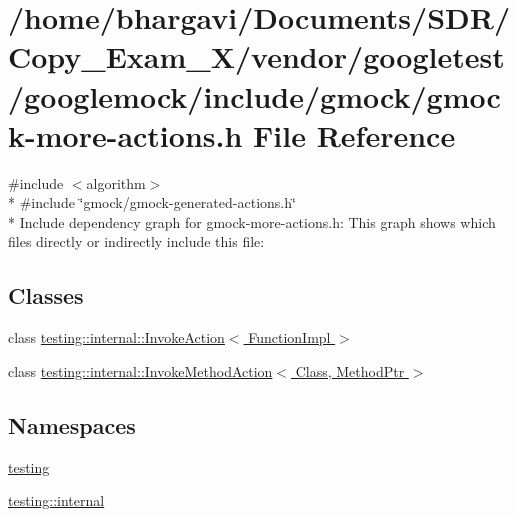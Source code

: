 \hypertarget{gmock-more-actions_8h}{}\section{/home/bhargavi/\+Documents/\+S\+D\+R/\+Copy\+\_\+\+Exam\+\_\+X/vendor/googletest/googlemock/include/gmock/gmock-\/more-\/actions.h File Reference}
\label{gmock-more-actions_8h}
{\ttfamily \#include $<$algorithm$>$}\\*
{\ttfamily \#include \char`\"{}gmock/gmock-\/generated-\/actions.\+h\char`\"{}}\\*
Include dependency graph for gmock-\/more-\/actions.h\+:
This graph shows which files directly or indirectly include this file\+:
\subsection*{Classes}
\begin{DoxyCompactItemize}
\item 
class \hyperlink{classtesting_1_1internal_1_1_invoke_action}{testing\+::internal\+::\+Invoke\+Action$<$ Function\+Impl $>$}
\item 
class \hyperlink{classtesting_1_1internal_1_1_invoke_method_action}{testing\+::internal\+::\+Invoke\+Method\+Action$<$ Class, Method\+Ptr $>$}
\end{DoxyCompactItemize}
\subsection*{Namespaces}
\begin{DoxyCompactItemize}
\item 
 \hyperlink{namespacetesting}{testing}
\item 
 \hyperlink{namespacetesting_1_1internal}{testing\+::internal}
\end{DoxyCompactItemize}
